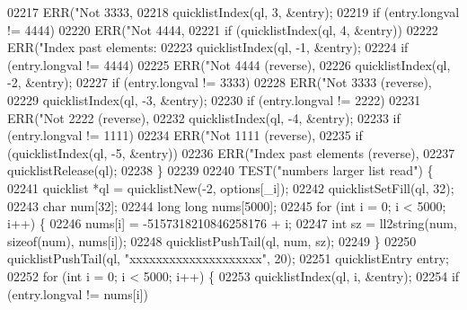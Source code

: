 \begin{DoxyCode}
{{{{{{{{{{{{{{{{{{{{{{{{{{{{{{{{{{{{{{{{{{{{{{{{{{{{{{{{{{{{{{{{{{{{{{{{02217                 ERR(\textcolor{stringliteral}{"Not 3333, %
02218             quicklistIndex(ql, 3, &entry);
02219             \textcolor{keywordflow}{if} (entry.longval != 4444)
02220                 ERR(\textcolor{stringliteral}{"Not 4444, %
02221             \textcolor{keywordflow}{if} (quicklistIndex(ql, 4, &entry))
02222                 ERR(\textcolor{stringliteral}{"Index past elements: %
02223             quicklistIndex(ql, -1, &entry);
02224             \textcolor{keywordflow}{if} (entry.longval != 4444)
02225                 ERR(\textcolor{stringliteral}{"Not 4444 (reverse), %
02226             quicklistIndex(ql, -2, &entry);
02227             \textcolor{keywordflow}{if} (entry.longval != 3333)
02228                 ERR(\textcolor{stringliteral}{"Not 3333 (reverse), %
02229             quicklistIndex(ql, -3, &entry);
02230             \textcolor{keywordflow}{if} (entry.longval != 2222)
02231                 ERR(\textcolor{stringliteral}{"Not 2222 (reverse), %
02232             quicklistIndex(ql, -4, &entry);
02233             \textcolor{keywordflow}{if} (entry.longval != 1111)
02234                 ERR(\textcolor{stringliteral}{"Not 1111 (reverse), %
02235             \textcolor{keywordflow}{if} (quicklistIndex(ql, -5, &entry))
02236                 ERR(\textcolor{stringliteral}{"Index past elements (reverse), %
02237             quicklistRelease(ql);
02238         \}
02239 
02240         TEST(\textcolor{stringliteral}{"numbers larger list read"}) \{
02241             quicklist *ql = quicklistNew(-2, options[\_i]);
02242             quicklistSetFill(ql, 32);
02243             \textcolor{keywordtype}{char} num[32];
02244             \textcolor{keywordtype}{long} \textcolor{keywordtype}{long} nums[5000];
02245             \textcolor{keywordflow}{for} (\textcolor{keywordtype}{int} i = 0; i < 5000; i++) \{
02246                 nums[i] = -5157318210846258176 + i;
02247                 \textcolor{keywordtype}{int} sz = ll2string(num, \textcolor{keyword}{sizeof}(num), nums[i]);
02248                 quicklistPushTail(ql, num, sz);
02249             \}
02250             quicklistPushTail(ql, \textcolor{stringliteral}{"xxxxxxxxxxxxxxxxxxxx"}, 20);
02251             quicklistEntry entry;
02252             \textcolor{keywordflow}{for} (\textcolor{keywordtype}{int} i = 0; i < 5000; i++) \{
02253                 quicklistIndex(ql, i, &entry);
02254                 \textcolor{keywordflow}{if} (entry.longval != nums[i])
}}}}}}}}}}}}}}}}}}}}}}}}}}}}}}}}}}}}}}}}}}}}}}}}}}}}}}}}}}}}}}}}}}}}}}}}}}}}}}}}
\end{DoxyCode}
